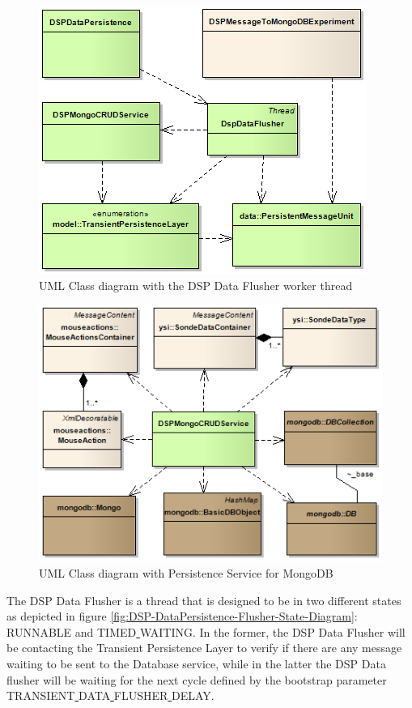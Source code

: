 \begin{figure}[!b]
  \centering
  \includegraphics[scale=0.5]{../diagrams/DSP-DataPersistence-Flusher-Classes}
  \caption{UML Class diagram with the DSP Data Flusher worker thread}
  \label{fig:DSP-DataPersistence-Flusher-Classes}
\end{figure}

\begin{figure}[!b]
  \centering
  \includegraphics[scale=0.5]{../diagrams/DSP-Data-Persistence-Mongo-Classes}
  \caption{UML Class diagram with Persistence Service for MongoDB}
  \label{fig:DSP-Data-Persistence-Mongo-Classes}
\end{figure}

The DSP Data Flusher is a thread that is designed to be in two different
states as depicted in figure
\ref{fig:DSP-DataPersistence-Flusher-State-Diagram}: RUNNABLE and
TIMED\underline{ }WAITING. In the former, the DSP Data Flusher will be
contacting the Transient Persistence Layer to verify if there are any message
waiting to be sent to the Database service, while in the latter the DSP Data
flusher will be waiting for the next cycle defined by the bootstrap parameter
TRANSIENT\underline{ }DATA\underline{ }FLUSHER\underline{ }DELAY.

